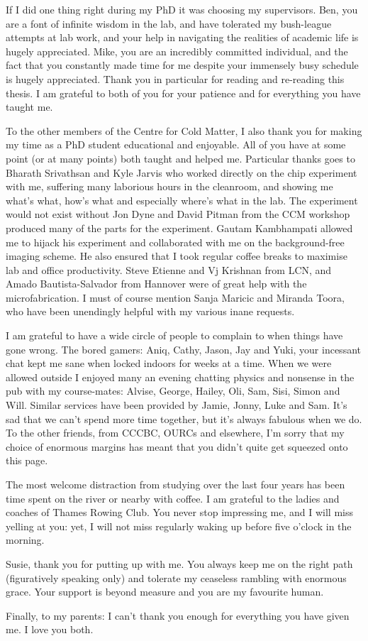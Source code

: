 \begin{singlespace}
If I did one thing right during my PhD it was choosing my supervisors. Ben, you
are a font of infinite wisdom in the lab, and have tolerated my bush-league
attempts at lab work, and your help in navigating the realities of academic
life is hugely appreciated. Mike, you are an incredibly committed individual,
and the fact that you constantly made time for me despite your immensely busy
schedule is hugely appreciated. Thank you in particular for reading and re-reading
this thesis.  I am grateful to both of you for your patience and for
everything you have taught me.

To the other members of the Centre for Cold Matter, I also thank you for making
my time as a PhD student educational and enjoyable. All of you have at some
point (or at many points) both taught and helped me.
%
Particular thanks goes to Bharath Srivathsan and Kyle Jarvis who worked
directly on the chip experiment with me, suffering many laborious hours in the
cleanroom, and showing me what's what, how's what and especially where's what
in the lab.
%
The experiment would not exist without Jon Dyne and David Pitman from the CCM
workshop produced many of the parts for the experiment.
%
Gautam Kambhampati allowed me to hijack his experiment and collaborated with me
on the background-free imaging scheme. He also ensured that I took
regular coffee breaks to maximise lab and office productivity.
%
Steve Etienne and Vj Krishnan from LCN, and Amado Bautista-Salvador from
Hannover were of great help with the microfabrication.
%
I must of course mention Sanja Maricic and Miranda Toora, who have been
unendingly helpful with my various inane requests.

I am grateful to have a wide circle of people to complain to when things have
gone wrong. The bored gamers: Aniq, Cathy, Jason, Jay and Yuki, your incessant
chat kept me sane when locked indoors for weeks at a time. When we were allowed
outside I enjoyed many an evening chatting physics and nonsense in the pub with
my course-mates: Alvise, George, Hailey, Oli, Sam, Sisi, Simon and Will. 
%
Similar services have been provided by Jamie, Jonny, Luke and Sam. It's sad
that we can't spend more time together, but it's always fabulous when we do. To
the other friends, from CCCBC, OURCs and elsewhere, I'm sorry that my choice of
enormous margins has meant that you didn't quite get squeezed onto this page.

The most welcome distraction from studying over the last four years has been
time spent on the river or nearby with coffee. I am grateful to the ladies and
coaches of Thames Rowing Club. You never stop impressing me, and I will miss
yelling at you: yet, I will not miss regularly waking up before five o'clock in the
morning.

Susie, thank you for putting up with me. You always keep me on the right path
(figuratively speaking only) and tolerate my ceaseless rambling with enormous
grace. Your support is beyond measure and you are my favourite human.

Finally, to my parents: I can't thank you enough for everything you have given
me. I love you both.

\end{singlespace}
